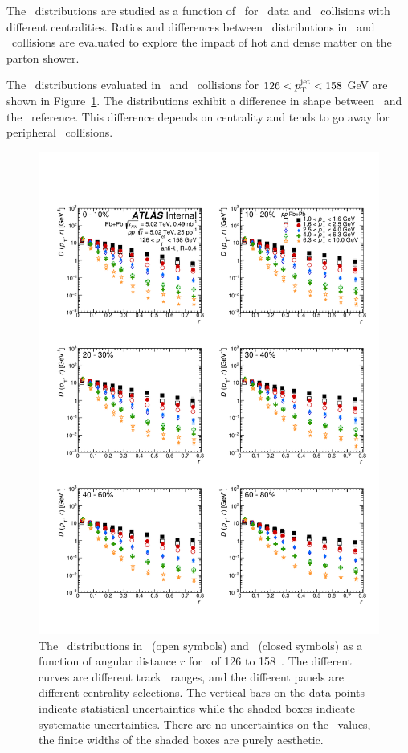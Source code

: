 
The \Dptr\ distributions are studied as a function of \ptjet\ for \pp\ data and \PbPb\ collisions with different centralities. Ratios and differences between \Dptr\ distributions in \pbpb\ and \pp\ collisions are evaluated to explore the impact of hot and dense matter on the parton shower.

The \Dptr\ distributions evaluated in \pp\ and \pbpb\ collisions for $126 < \mbox{$p_{\mathrm{T}}^{\mathrm{jet}}$} < 158$ GeV are shown in Figure~\ref{fig:dptr}. The distributions exhibit a difference in shape between \PbPb\ and the \pp\ reference. This difference depends on centrality and tends to go away for peripheral \pbpb\ collisions.

\begin{figure}[h]
\centerline{
            \includegraphics[width=1\textwidth]{figures/results/yChPS_final_dR_CONF_DpT_data_jet7.pdf} 
      }
\caption{The \Dptr\ distributions in \pp\ (open symbols) and \pbpb\ (closed symbols) as a function of angular distance $r$ for \ptjet\ of 126 to 158~\GeV. The different curves are different track \pt\ ranges, and the different panels are different centrality selections. The vertical bars on the data points indicate statistical uncertainties while the shaded boxes indicate systematic uncertainties. There are no uncertainties on the \rvar\ values, the finite widths of the shaded boxes are purely aesthetic.}
\label{fig:dptr}
\end{figure}


